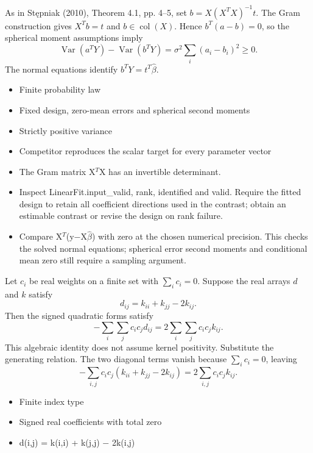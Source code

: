\expandafter\def\csname statadic@proof@STATADIC-LINEAR-005\endcsname{As in Stępniak (2010), Theorem 4.1, pp. 4--5,
  set $b=X(X^TX)^{-1}t$. The Gram construction gives $X^Tb=t$ and
  $b\in\operatorname{col}(X)$.
  Hence $b^T(a-b)=0$, so the spherical moment assumptions imply
  \[ \operatorname{Var}(a^TY)-\operatorname{Var}(b^TY)
     =\sigma^2\sum_i(a_i-b_i)^2\geq0. \]
  The normal equations identify $b^TY=t^T\hat\beta$.}
\expandafter\def\csname statadic@assumptions@STATADIC-LINEAR-005\endcsname{\begin{itemize}
\item Finite probability law
\item Fixed design, zero-mean errors and spherical second moments
\item Strictly positive variance
\item Competitor reproduces the scalar target for every parameter vector
\item The Gram matrix X\ensuremath{{}^T}X has an invertible determinant.
\end{itemize}}
\expandafter\def\csname statadic@diagnostics@STATADIC-LINEAR-005\endcsname{\begin{itemize}
\item Inspect LinearFit.input\_valid, rank, identified and valid. Require the fitted design to retain all coefficient directions used in the contrast; obtain an estimable contrast or revise the design on rank failure.
\item Compare X\ensuremath{{}^T}(y\ensuremath{-}X\ensuremath{\hat\beta}) with zero at the chosen numerical precision. This checks the solved normal equations; spherical error second moments and conditional mean zero still require a sampling argument.
\end{itemize}}
\expandafter\def\csname statadic@statement@STATADIC-ENERGY-001\endcsname{Let $c_i$ be real weights on a finite set with
  $\sum_i c_i=0$. Suppose the real arrays $d$ and $k$ satisfy
  \[
    d_{ij}=k_{ii}+k_{jj}-2k_{ij}.
  \]
  Then the signed quadratic forms satisfy
  \[
    -\sum_i\sum_j c_i c_j d_{ij}
      =2\sum_i\sum_j c_i c_j k_{ij}.
  \]
  This algebraic identity does not assume kernel positivity.}
\expandafter\def\csname statadic@proof@STATADIC-ENERGY-001\endcsname{Substitute the generating relation. The two diagonal terms vanish
  because $\sum_i c_i=0$, leaving
  \[
    -\sum_{i,j}c_i c_j(k_{ii}+k_{jj}-2k_{ij})
      =2\sum_{i,j}c_i c_j k_{ij}.
  \]}
\expandafter\def\csname statadic@assumptions@STATADIC-ENERGY-001\endcsname{\begin{itemize}
\item Finite index type
\item Signed real coefficients with total zero
\item d(i,j) = k(i,i) + k(j,j) \ensuremath{-} 2k(i,j)
\end{itemize}}
